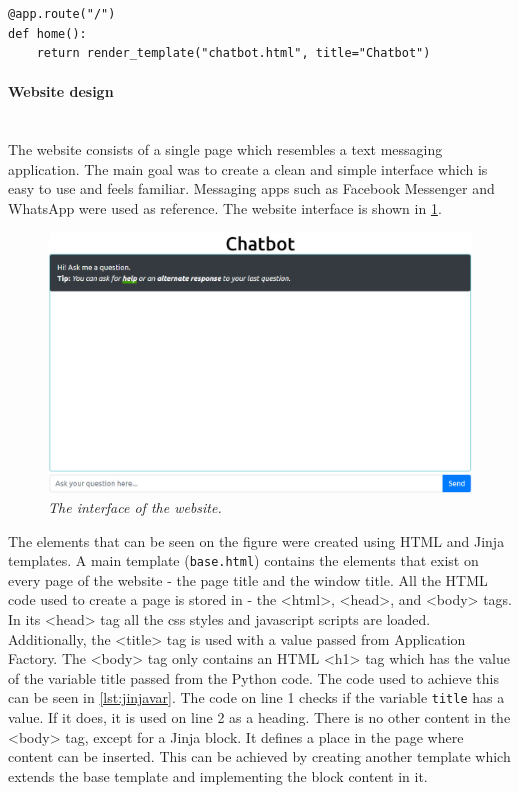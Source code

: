 \documentclass[12pt,a4paper]{article}
\newcommand{\myparagraph}[1]{\paragraph{#1}\mbox{}\\}
\newcommand{\captionstyle}[1] {
    \small{\textit{#1}}
}
\begin{document}
\begin{lstlisting}[caption={\captionstyle{Initialisation of the home page of the Flask application.}}, label={lst:homepage}]
@app.route("/")
def home():
    return render_template("chatbot.html", title="Chatbot")
\end{lstlisting}

\myparagraph{Website design}
The website consists of a single page which resembles a text messaging application. The main goal was to create a clean and simple interface which is easy to use and feels familiar. Messaging apps such as Facebook Messenger and WhatsApp were used as reference. The website interface is shown in \cref{fig:site-interface}.

\begin{figure}[!htb]%
    \centering
    \includegraphics[width=1.0\columnwidth]{app-interface}%
    \caption{\captionstyle{The interface of the website.}}%
    \label{fig:site-interface}%
\end{figure}

The elements that can be seen on the figure were created using HTML and Jinja templates. A main template (\texttt{base.html}) contains the elements that exist on every page of the website - the page title and the window title. All the HTML code used to create a page is stored in - the <html>, <head>, and <body> tags. In its <head> tag all the css styles and javascript scripts are loaded. Additionally, the <title> tag is used with a value passed from Application Factory. The <body> tag only contains an HTML <h1> tag which has the value of the variable title passed from the Python code. The code used to achieve this can be seen in \cref{lst:jinjavar}. The code on line 1 checks if the variable \texttt{title} has a value. If it does, it is used on line 2 as a heading. There is no other content in the <body> tag, except for a Jinja block. It defines a place in the page where content can be inserted. This can be achieved by creating another template which extends the base template and implementing the block content in it.
\end{document}
